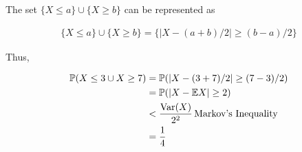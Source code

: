 
The set $ \{ X \leq a  \} \cup \{ X \geq b \}  $ can be represented as

\begin{align*}
    \{ X \leq a \} \cup \{ X \geq b \} = \{ |X - (a+b)/2| \geq (b-a)/2\} 
\end{align*}

Thus, 

\begin{align*}
    \mathbb P (X \leq 3 \cup X \geq 7) &= \mathbb P( |X - (3+7)/2| \geq (7-3)/2)\\
				&= \mathbb P( |X - \mathbb{E} X| \geq 2)\\
				&< \frac{\mathrm{Var}(X)}{2^2} \, \mbox{Markov's Inequality} \\
				&= \frac{1}{4} 
\end{align*}
